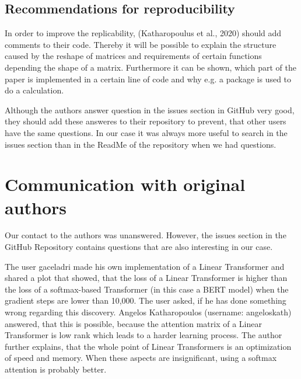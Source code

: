 \documentclass[DIV=13,fontsize=11pt]{scrartcl}
\begin{document}


\subsection{Recommendations for reproducibility}
In order to improve the replicability, (Katharopoulus et al., 2020) should add comments to their code. Thereby it will be possible to explain the structure caused by the reshape of matrices and requirements of certain functions depending the shape of a matrix. Furthermore it can be shown, which part of the paper is implemented in a certain line of code and why e.g. a package is used to do a calculation.

Although the authors answer question in the issues section in GitHub very good, they should add these answeres to their repository to prevent, that other users have the same questions. In our case it was always more useful to search in the issues section than in the ReadMe of the repository when we had questions.


\section{Communication with original authors}
Our contact to the authors was unanswered. However, the issues section in the GitHub Repository contains questions that are also interesting in our case.

The user gaceladri made his own implementation of a Linear Transformer and shared a plot that showed, that the loss of a Linear Transformer is higher than the loss of a softmax-based Transformer (in this case a BERT model) when the gradient steps are lower than 10,000.  The user asked, if he has done something wrong regarding this discovery. Angelos Katharopoulos (username: angeloskath) answered, that this is possible, because the attention matrix of a Linear Transformer is low rank which leads to a harder learning process. The author further explains, that the whole point of Linear Transformers is an optimization of speed and memory. When these aspects are insignificant, using a softmax attention is probably better. 
\end{document}
